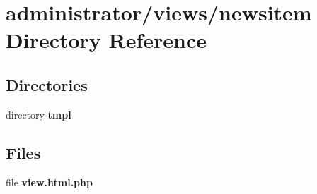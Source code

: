 \section{administrator/views/newsitem Directory Reference}
\label{dir_40ec5fa924f6deabc7e1885a40639648}
\subsection*{Directories}
\begin{DoxyCompactItemize}
\item 
directory \textbf{ tmpl}
\end{DoxyCompactItemize}
\subsection*{Files}
\begin{DoxyCompactItemize}
\item 
file \textbf{ view.\+html.\+php}
\end{DoxyCompactItemize}
